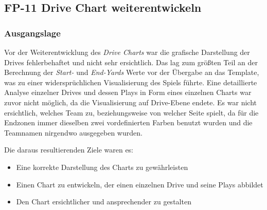 
\subsection{FP-11 Drive Chart weiterentwickeln}

\subsubsection{Ausgangslage}
\vspace*{0.5cm}
Vor der Weiterentwicklung des \textit{Drive Charts} war die grafische Darstellung der Drives fehlerbehaftet und nicht sehr ersichtlich. Das lag zum größten Teil an der Berechnung der \textit{Start-} und \textit{End-Yards} Werte vor der Übergabe an das Template, was zu einer widersprüchlichen Visualisierung des Spiels führte. 
Eine detaillierte Analyse einzelner Drives und dessen Plays in Form eines einzelnen Charts war zuvor nicht möglich, da die Visualisierung auf Drive-Ebene endete. 
Es war nicht ersichtlich, welches Team zu, beziehungsweise von welcher Seite spielt, da für die Endzonen immer dieselben zwei vordefinierten Farben benutzt wurden und die Teamnamen nirgendwo ausgegeben wurden.
\vspace*{0.3cm}

Die daraus resultierenden Ziele waren es:
\begin{itemize}
    \item Eine korrekte Darstellung des Charts zu gewährleisten
    \item Einen Chart zu entwickeln, der einen einzelnen Drive und seine Plays abbildet
    \item Den Chart ersichtlicher und ansprechender zu gestalten
\end{itemize}
\vspace*{0.5cm}
